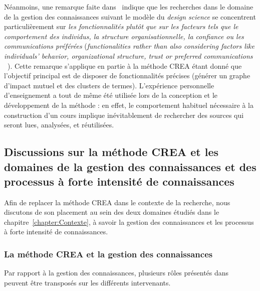 \bigskip

Néanmoins, une remarque faite dans~\cite{schacht2016methodology} indique que les recherches dans le domaine de la gestion des connaissances suivant le modèle du \textit{design science} se concentrent particulièrement sur \og \textit{les fonctionnalités plutôt que sur les facteurs tels que le comportement des individus, la structure organisationnelle, la confiance ou les communications préférées} \fg (\og \textit{functionalities rather than also considering factors like individuals' behavior, organizational structure, trust or preferred communications} \fg~\cite{schacht2016methodology}).
Cette remarque s'applique en partie à la méthode CREA étant donné que l'objectif principal est de disposer de fonctionnalités précises (générer un graphe d'impact mutuel et des clusters de termes).
L'expérience personnelle d'enseignement a tout de même été utilisée lors de la conception et le développement de la méthode : en effet, le comportement habituel nécessaire à la construction d'un cours implique inévitablement de rechercher des sources qui seront lues, analysées, et réutilisées.

\bigskip



\subsection{Discussions sur la méthode CREA et les domaines de la gestion des connaissances et des processus à forte intensité de connaissances}
\label{subsection:Evaluation:Discussions:DiscussionsDomaines}

Afin de replacer la méthode CREA dans le contexte de la recherche, nous discutons de son placement au sein des deux domaines étudiés dans le chapitre~\ref{chapter:Contexte}, à savoir la gestion des connaissances et les processus à forte intensité de connaissances.


\subsubsection{La méthode CREA et la gestion des connaissances}
\label{subsubsection:Evaluation:Discussions:DiscussionsDomaines:KM}


Par rapport à la gestion des connaissances, plusieurs rôles présentés dans~\cite{markus2001toward} peuvent être transposés sur les différents intervenants.

